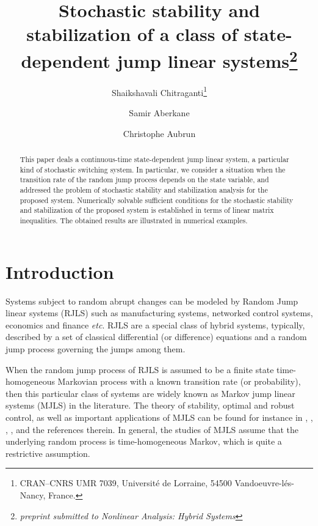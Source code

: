 \documentclass[10.5pt,a4paper]{article}
\theoremstyle{remark}
\theoremstyle{plain}
\theoremstyle{plain}
\theoremstyle{remark}
\theoremstyle{plain}
\theoremstyle{plain}
\begin{document}
\title{Stochastic stability and stabilization of a class of state-dependent
jump linear systems\footnote{\textit{preprint submitted to Nonlinear Analysis: Hybrid Systems}}}


\author{Shaikshavali Chitraganti\thanks{CRAN--CNRS UMR 7039, Universit\'{e} de Lorraine, 54500 Vandoeuvre-l\'{e}s-Nancy, France.} \and Samir Aberkane\footnotemark[2] \and Christophe Aubrun\footnotemark[2] }
\date{}

\maketitle
\thispagestyle{empty} 
\begin{abstract}
This paper deals a continuous-time state-dependent jump linear
system, a particular kind of stochastic switching system. In particular,
we consider a situation when the transition rate of the random jump
process depends on the state variable, and addressed the problem of
stochastic stability and stabilization analysis for the proposed system.
Numerically solvable sufficient conditions for the stochastic stability
and stabilization of the proposed system is established in terms of
linear matrix inequalities. The obtained results are illustrated in
numerical examples.
\end{abstract}
\section{Introduction}\label{section:introduction}

Systems subject to random abrupt changes can be modeled by Random Jump linear systems (RJLS) such as manufacturing systems, networked control systems, economics and finance \textit{etc}. RJLS are a special class of hybrid systems, typically, described by a set of classical differential (or difference) equations and a random jump process governing the jumps among them.

When the random jump process of RJLS is assumed to be a finite state time-homogeneous Markovian process with a known transition rate (or probability), then this particular class of systems are widely known as Markov jump linear systems (MJLS) in the literature. The theory of stability, optimal and robust control, as well as important applications of MJLS can be found for instance in \cite{feng}, \cite{mariton}, \cite{kozin}, \cite{yji}, \cite{fangphd} and the references therein. In general, the studies of MJLS assume that the underlying random process is time-homogeneous Markov, which is quite a restrictive assumption. 
\end{document}
